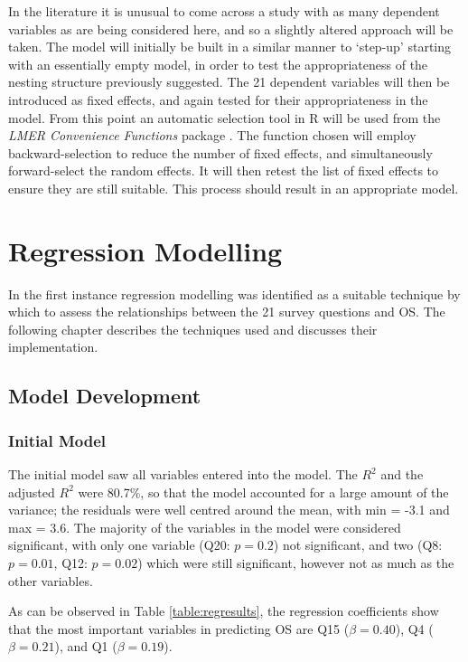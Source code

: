 \documentclass[11pt,a4paper]{report}
\begin{document}
In the literature it is unusual to come across a study with as many dependent variables as are being considered here, and so a slightly altered approach will be taken. The model will initially be built in a similar manner to `step-up' starting with an essentially empty model, in order to test the appropriateness of the nesting structure previously suggested. The 21 dependent variables will then be introduced as fixed effects, and again tested for their appropriateness in the model. From this point an automatic selection tool in R will be used from the \textit{LMER Convenience Functions} package \cite{lmerconvenience}. The function chosen will employ backward-selection to reduce the number of fixed effects, and simultaneously forward-select the random effects. It will then retest the list of fixed effects to ensure they are still suitable. This process should result in an appropriate model. 

\newpage
\chapter{Regression Modelling}
In the first instance regression modelling was identified as a suitable technique by which to assess the relationships between the 21 survey questions and \ac{OS}. The following chapter describes the techniques used and discusses their implementation.

\section{Model Development}

\subsection{Initial Model}
The initial model saw all variables entered into the model. The $R^{2}$ and the adjusted $R^{2}$ were 80.7\%, so that the model accounted for a large amount of the variance; the residuals were well centred around the mean, with min = -3.1 and max = 3.6. The majority of the variables in the model were considered significant, with only one variable (Q20: $p=0.2$) not significant, and two (Q8: $p=0.01$, Q12: $p=0.02$) which were still significant, however not as much as the other variables. 

As can be observed in Table \ref{table:regresults}, the regression coefficients show that the most important variables in predicting \ac{OS} are Q15 ($\beta = 0.40$), Q4 ($\beta = 0.21$), and Q1 ($\beta = 0.19$).
\end{document}
